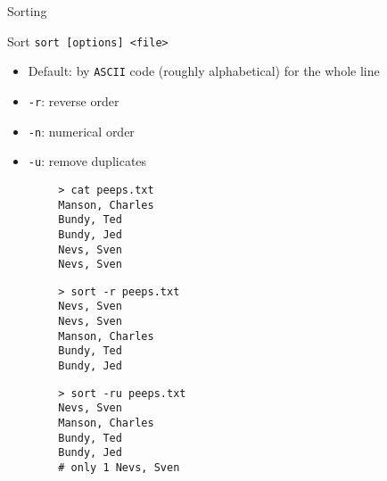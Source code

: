 \documentclass[11pt]{beamer}
\newcommand{\colbf}[1]{\textcolor{mLightBrown!77!black}{#1}}%
\begin{document}
\begin{frame}[fragile]{Sorting}
  \begin{block}{\colbf{Sort}}
    \texttt{sort [options] <file>}
    \begin{itemize}
      \item Default: by \texttt{ASCII} code (roughly alphabetical) for the whole line
      \item \texttt{-r}: reverse order
      \item \texttt{-n}: numerical order
      \item \texttt{-u}: remove duplicates
    \end{itemize}
  \end{block}
  \vspace*{-2ex}
  \begin{minipage}[t]{\textwidth}
    \begin{minipage}[t]{.3\textwidth}
      \begin{verbatim}
        > cat peeps.txt
        Manson, Charles
        Bundy, Ted
        Bundy, Jed
        Nevs, Sven
        Nevs, Sven
      \end{verbatim}
    \end{minipage}
    \hfill
    \begin{minipage}[t]{.3\textwidth}
      \begin{verbatim}
        > sort -r peeps.txt
        Nevs, Sven
        Nevs, Sven
        Manson, Charles
        Bundy, Ted
        Bundy, Jed
      \end{verbatim}
    \end{minipage}
    \hfill
    \begin{minipage}[t]{.3\textwidth}
      \begin{verbatim}
        > sort -ru peeps.txt
        Nevs, Sven
        Manson, Charles
        Bundy, Ted
        Bundy, Jed
        # only 1 Nevs, Sven
      \end{verbatim}
    \end{minipage}
  \end{minipage}
\end{frame}
\end{document}
